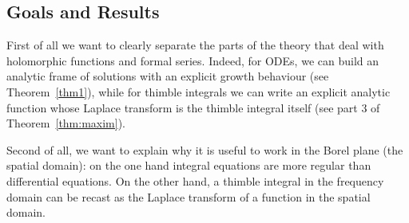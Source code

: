 \documentclass{article}
\theoremstyle{definition}
\newcommand{\laplace}{\mathcal{L}}
\newcommand{\borel}{\mathcal{B}}
\begin{document}



\subsection{Goals and Results}

First of all we want to clearly separate the parts of the theory that deal with holomorphic functions and formal series. Indeed, for ODEs, we can build an analytic frame of solutions with an explicit growth behaviour (see Theorem~\ref{thm1}), while for thimble integrals we can write an explicit analytic function whose Laplace transform is the thimble integral itself (see part 3 of Theorem~\ref{thm:maxim}). 

Second of all, we want to explain why it is useful to work in the Borel plane (the spatial domain): on the one hand integral equations are more regular than differential equations. On the other hand, a thimble integral in the frequency domain can be recast as the Laplace transform of a function in the spatial domain. 
\end{document}
